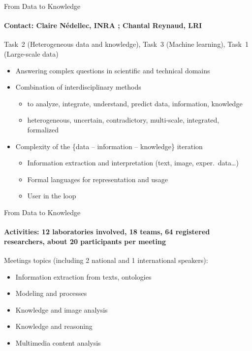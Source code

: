 \begin{frame}{From Data to Knowledge}
\framesubtitle{Contact: Claire Nédellec, INRA ; Chantal Reynaud, LRI }
Task~2 (Heterogeneous data and knowledge), Task~3 (Machine learning), Task~1  (Large-scale data)
\begin{itemize}
\item Answering complex questions in scientific and technical domains
\item Combination of interdisciplinary methods
  \begin{itemize}
  \item to analyze, integrate, understand, predict data, information, knowledge
  \item heterogeneous, uncertain, contradictory, multi-scale, integrated, formalized
  \end{itemize}
\item Complexity of the \{data -- information -- knowledge\} iteration
  \begin{itemize}
  \item Information extraction and interpretation (text, image, exper.\ data\ldots)
  \item Formal languages for representation and usage
  \item User in the loop
  \end{itemize}
\end{itemize}


\end{frame}

\begin{frame}{From Data to Knowledge}
\framesubtitle{Activities: 12 laboratories involved, 18 teams, 64 registered researchers, about 20 participants per meeting}

Meetings topics (including 2 national and 1 international speakers):
\begin{itemize}
\item Information extraction from texts, ontologies
\item Modeling and processes
\item Knowledge and image analysis
\item Knowledge and reasoning
\item Multimedia content analysis
\end{itemize}

\end{frame}

